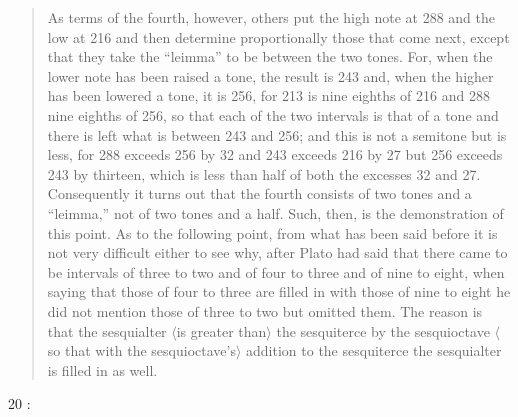 \documentclass{amsart}
\theoremstyle{definition}
\begin{document}
\begin{quote}
As terms of the fourth, however, others put the high note at 288 and the low at 216 and then determine proportionally those that come next, except that they take the ``leimma'' to be
 between the two tones. For, when the lower note has been raised a tone, the result is 243 and, when the higher has been lowered a tone, it is 256, for 213 is nine eighths of 216 and
 288 nine eighths of 256, so that each of the two intervals is that of a tone and there is left what is between 243 and 256; and this is not a semitone but
is less, for 288 exceeds 256 by 32 and 243 exceeds 216 by 27 but 256 exceeds 243 by thirteen, which is less than half of both the excesses 32 and 27. Consequently it turns out
that the fourth consists of two tones and a ``leimma,'' not of two tones and a half. Such, then, is the demonstration of this point. As to the following point, from what has been said
before it is not very difficult either to see why, after Plato had said that there came to be intervals of three to two and of four to three and of nine to eight, when saying that those of four
to three are filled in with those of nine to eight he did not mention those of three to two but omitted them. The reason is that the sesquialter {$\langle$}is greater than{$\rangle$} the 
sesquiterce by the sesquioctave {$\langle$}so that with the sesquioctave's{$\rangle$} addition to the sesquiterce the sesquialter is filled in as well.
\end{quote}

20 \cite[pp.~317--321]{chernissI}:
\end{document}
